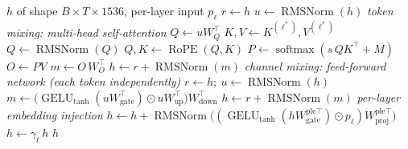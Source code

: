 \documentclass[10pt,a4paper]{article}
\newcommand{\op}[1]{\operatorname{#1}}
\theoremstyle{definition}
\begin{document}
\begin{algorithm}[H]
\caption{Block $\mathcal{B}_{\mathrm{F2}}(h)$ --- Full (global) attention block (KV-shared, MLP width 12288)}
\begin{algorithmic}[1]
\Require $h$ of shape $B\times T\times 1536$, per-layer input $p_\ell$
\State $r \gets h$ 
\State $u \gets \op{RMSNorm}(h)$ 
\Statex \hspace{-1.2em}\textit{token mixing: multi-head self-attention}
\State $Q \gets u W_Q^{\top}$ 
\State $K, V \gets K^{(\ell^*)}, V^{(\ell^*)}$ 
\State $Q \gets \op{RMSNorm}(Q)$ 
\State $Q, K \gets \op{RoPE}(Q, K)$ 
\State $P \gets \op{softmax}(s\, Q K^{\top} + M)$ 
\State $O \gets P V$ 
\State $m \gets O\, W_O^{\top}$ 
\State $h \gets r + \op{RMSNorm}(m)$ 
\Statex \hspace{-1.2em}\textit{channel mixing: feed-forward network (each token independently)}
\State $r \gets h;\ u \gets \op{RMSNorm}(h)$
\State $m \gets \big(\op{GELU}_{\tanh}(u W_{\mathrm{gate}}^{\top}) \odot u W_{\mathrm{up}}^{\top}\big) W_{\mathrm{down}}^{\top}$ 
\State $h \gets r + \op{RMSNorm}(m)$ 
\Statex \hspace{-1.2em}\textit{per-layer embedding injection}
\State $h \gets h + \op{RMSNorm}\big((\op{GELU}_{\tanh}(h W^{\mathrm{ple}\top}_{\mathrm{gate}}) \odot p_\ell) W^{\mathrm{ple}\top}_{\mathrm{proj}}\big)$ 
\State $h \gets \gamma_\ell\, h$ 
\State \Return $h$
\end{algorithmic}
\end{algorithm}
\end{document}
